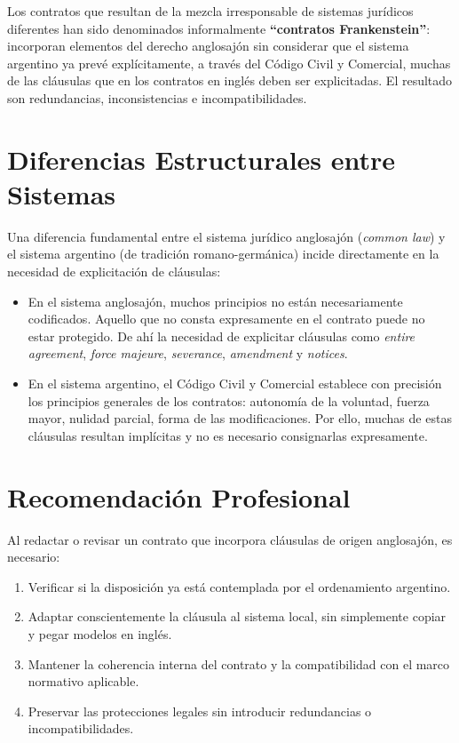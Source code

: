 \documentclass[12pt,oneside]{book}
\begin{document}
\begin{important}
Los contratos que resultan de la mezcla irresponsable de sistemas jurídicos
diferentes han sido denominados informalmente \textbf{``contratos
Frankenstein''}: incorporan elementos del derecho anglosajón sin considerar
que el sistema argentino ya prevé explícitamente, a través del Código Civil
y Comercial, muchas de las cláusulas que en los contratos en inglés deben
ser explicitadas. El resultado son redundancias, inconsistencias e
incompatibilidades.
\end{important}

\section{Diferencias Estructurales entre Sistemas}

Una diferencia fundamental entre el sistema jurídico anglosajón (\textit{common
law}) y el sistema argentino (de tradición romano-germánica) incide
directamente en la necesidad de explicitación de cláusulas:

\begin{itemize}
    \item En el sistema anglosajón, muchos principios no están
    necesariamente codificados. Aquello que no consta expresamente en el
    contrato puede no estar protegido. De ahí la necesidad de explicitar
    cláusulas como \textit{entire agreement}, \textit{force majeure},
    \textit{severance}, \textit{amendment} y \textit{notices}.
    \item En el sistema argentino, el Código Civil y Comercial establece
    con precisión los principios generales de los contratos: autonomía de
    la voluntad, fuerza mayor, nulidad parcial, forma de las modificaciones.
    Por ello, muchas de estas cláusulas resultan implícitas y no es
    necesario consignarlas expresamente.
\end{itemize}

\section{Recomendación Profesional}

Al redactar o revisar un contrato que incorpora cláusulas de origen
anglosajón, es necesario:
\begin{enumerate}
    \item Verificar si la disposición ya está contemplada por el
    ordenamiento argentino.
    \item Adaptar conscientemente la cláusula al sistema local, sin
    simplemente copiar y pegar modelos en inglés.
    \item Mantener la coherencia interna del contrato y la compatibilidad
    con el marco normativo aplicable.
    \item Preservar las protecciones legales sin introducir redundancias o
    incompatibilidades.
\end{enumerate}
\end{document}
